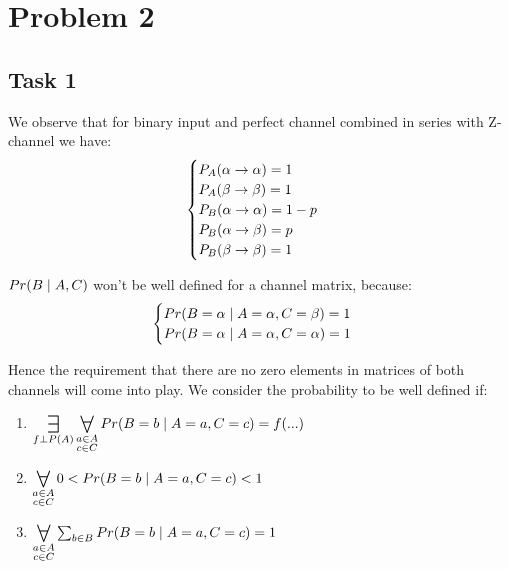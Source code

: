 

\section{Problem 2}

\subsection{Task 1}

We observe that for binary input and perfect channel combined in series with Z-channel we have:
\begin{equation}
\begin{cases}
    \prtf{A}{\alpha}{\alpha} = 1 \\
    \prtf{A}{\beta}{\beta} = 1 \\
    \prtf{B}{\alpha}{\alpha} = 1-p \\
    \prtf{B}{\alpha}{\beta} = p \\
    \prtf{B}{\beta}{\beta} = 1
\end{cases}
\end{equation}

$\prob{B}[A,C]$ won't be well defined for a channel matrix, because:
\begin{equation}
\begin{cases}
\prob{B=\alpha}[A=\alpha, C=\beta] = 1 \\
\prob{B=\alpha}[A=\alpha, C=\alpha] = 1
\end{cases}
\end{equation}

Hence the requirement that there are no zero elements in matrices of both channels will come into play.
We consider the probability to be well defined if:

\begin{enumerate}
\item $\bigexists_{f \perp P(A)}{\bigforall_{\substack{a \in A \\ c \in C}}{ \prob{B=b}[A=a, C=c] = f(...) }}$
\item $\bigforall_{\substack{a \in A \\ c \in C}}{ 0 < \prob{B=b}[A=a, C=c] < 1 }$
\item $\bigforall_{\substack{a \in A \\ c \in C}}{ \sum_{b \in B}{\prob{B=b}[A=a, C=c]} = 1 }$
\end{enumerate}

